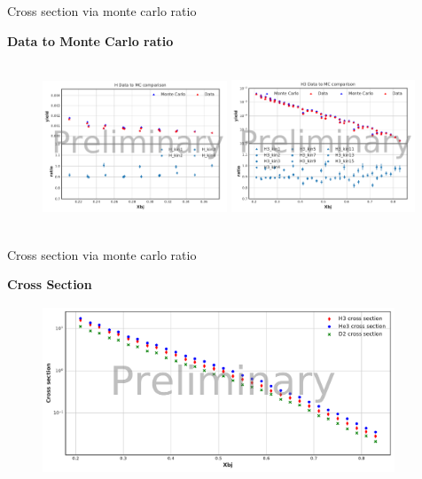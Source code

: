 \documentclass{beamer}
\begin{document}
\begin{frame}{Cross section via monte carlo ratio}
\begin{block}{\textbf{Data to Monte Carlo ratio}}
	\begin{figure}
	\hspace*{-0.5cm}\includegraphics[height=5cm,width=5.50cm]{../images/H_all.pdf}			\hspace*{0.5cm}\includegraphics[height=5cm,width=5.50cm]{../images/H3_all.pdf}
	\end{figure}
\end{block}
\end{frame}

\begin{frame}{Cross section via monte carlo ratio}
\begin{block}{\textbf{Cross Section}}
	\begin{figure}
		\hspace*{-0.5cm}\includegraphics[height=5cm,width=10.50cm]{../images/multisigma.pdf}		
	\end{figure}
\end{block}
\end{frame}
\end{document}
